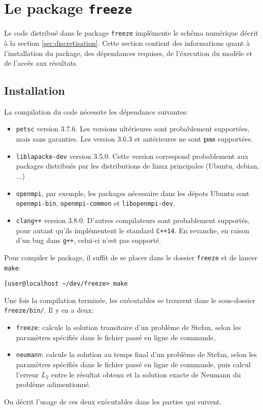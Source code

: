 \section{Le package \texttt{freeze}}
Le code distribu\'e dans le package \texttt{freeze} impl\'emente le
sch\'ema num\'erique d\'ecrit \`a la section
\ref{sec:discretisation}. Cette section contient des informations
quant \`a l'installation du package, des d\'ependances requises, de
l'\'execution du mod\`ele et de l'acc\`es aux r\'esultats.

\subsection{Installation}
La compilation du code n\'ecessite les d\'ependance suivantes:
\begin{itemize}
  \item \texttt{petsc} version 3.7.6. Les versions ult\'erieures sont
    probablement support\'ees, mais sans garanties. Les version 3.6.3
    et ant\'erieures ne sont \textbf{pas} support\'ees.
  \item \texttt{liblapacke-dev} version 3.5.0. Cette version
    correspond probablement aux packages distribu\'es par les
    distributions de linux principales (Ubuntu, debian, ...)
  \item \texttt{openmpi}, par exemple, les packages n\'ecessaire dans les d\'epots
    Ubuntu sont \texttt{openmpi-bin}, \texttt{openmpi-common} et
    \texttt{libopenmpi-dev},
  \item \texttt{clang++} version 3.8.0. D'autres compilateurs sont
    probablement support\'es, pour autant qu'ils impl\'ementent le
    standard \texttt{C++14}. En revanche, en raison d'un bug dans
    \texttt{g++}, celui-ci n'est pas support\'e.
\end{itemize}

Pour compiler le package, il suffit de se placer dans le dossier
\texttt{freeze} et de lancer \texttt{make}:
\begin{lstlisting}[language={},frame=single,basicstyle=\ttfamily\footnotesize]
  [user@localhost ~/dev/freeze> make
\end{lstlisting}
Une fois la compilation termin\'ee, les ex\'ecutables se trouvent dans
le sous-dossier \texttt{freeze/bin/}. Il y en a deux:
\begin{itemize}
\item \texttt{freeze}: calcule la solution transitoire d'un probl\`eme
  de Stefan, selon les param\`etres sp\'ecifi\'es dans le fichier
  pass\'e en ligne de commande,
\item \texttt{neumann}: calcule la solution au temps final d'un probl\`eme
  de Stefan, selon les param\`etres sp\'ecifi\'es dans le fichier
  pass\'e en ligne de commande, puis calcul l'erreur $L_2$ entre le
  r\'esultat obtenu et la solution exacte de Neumann du probl\`eme
  adimentionn\'e.
\end{itemize}
On d\'ecrit l'usage de ces deux ex\'ecutables dans les parties qui suivent.


